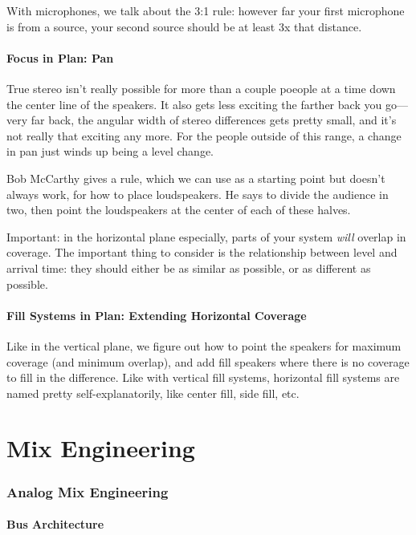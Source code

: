 \documentclass[a4paper]{article}
\begin{document}
With microphones, we talk about the 3:1 rule: however far your first
microphone is from a source, your second source should be at least 3x that
distance.

\subsection{Focus in Plan: Pan}

True stereo isn't really possible for more than a couple poeople at a time down
the center line of the speakers. It also gets less exciting the farther back
you go---very far back, the angular width of stereo differences gets pretty
small, and it's not really that exciting any more. For the people outside of
this range, a change in pan just winds up being a level change.

Bob McCarthy gives a rule, which we can use as a starting point but doesn't
always work, for how to place loudspeakers. He says to divide the audience in
two, then point the loudspeakers at the center of each of these halves.

Important: in the horizontal plane especially, parts of your system \emph{will}
overlap in coverage. The important thing to consider is the relationship
between level and arrival time: they should either be as similar as possible,
or as different as possible.

\subsection{Fill Systems in Plan: Extending Horizontal Coverage}

Like in the vertical plane, we figure out how to point the speakers for maximum
coverage (and minimum overlap), and add fill speakers where there is no
coverage to fill in the difference. Like with vertical fill systems, horizontal
fill systems are named pretty self-explanatorily, like center fill, side fill,
etc.

\part{Mix Engineering}

\section{Analog Mix Engineering}

\subsection{Bus Architecture}
\end{document}
